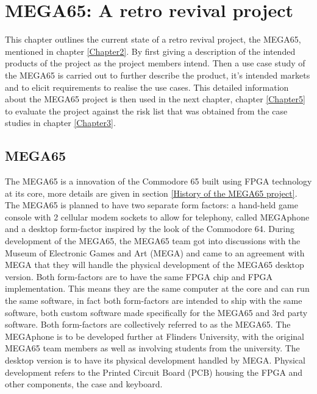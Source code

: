 
\chapter{MEGA65: A retro revival project}
\label{Chapter4}

This chapter outlines the current state of a retro revival project, the MEGA65, mentioned in chapter \ref{Chapter2}. By first giving a description of the intended products of the project as the project members intend. Then a use case study of the MEGA65 is carried out to further describe the product, it's intended markets and to elicit requirements to realise the use cases. This detailed information about the MEGA65 project is then used in the next chapter, chapter \ref{Chapter5} to evaluate the project against the risk list that was obtained from the case studies in chapter \ref{Chapter3}.
\section{MEGA65}
The MEGA65 is a innovation of the Commodore 65 built using FPGA technology at its core, more details are given in section \ref{History of the MEGA65 project}. The MEGA65 is planned to have two separate form factors: a hand-held game console with 2 cellular modem sockets to allow for telephony, called MEGAphone and a desktop form-factor inspired by the look of the Commodore 64. During development of the MEGA65, the MEGA65 team got into discussions with the Museum of Electronic Games and Art (MEGA) and came to an agreement with MEGA that they will handle the physical development of the MEGA65 desktop version. Both form-factors are to have the same FPGA chip and FPGA implementation. This means they are the same computer at the core and can run the same software, in fact both form-factors are intended to ship with the same software, both custom software made specifically for the MEGA65 and 3rd party software. Both form-factors are collectively referred to as the MEGA65. The MEGAphone is to be developed further at Flinders University, with the original MEGA65 team members as well as involving students from the university. The desktop version is to have its physical development handled by MEGA. Physical development refers to the Printed Circuit Board (PCB) housing the FPGA and other components, the case and keyboard. 

